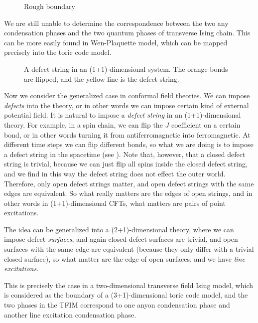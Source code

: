 \documentclass[hyperref, a4paper]{article}
\begin{document}
\begin{figure}
    \centering
    
    \caption{Rough boundary}
    \label{fig:rough}
\end{figure}

We are still unable to determine the correspondence between the two any condensation phases and the two quantum
phases of transverse Ising chain. This can be more easily found in Wen-Plaquette model, which can be mapped 
precisely into the toric code model. 

\begin{figure}
    \centering
    
    \caption{A defect string in an (1+1)-dimensional system. The orange bonds are flipped, and the yellow line is the defect string.}
    \label{fig:defect-string-1d}
\end{figure}

Now we consider the generalized case in conformal field theories. We can impose \emph{defects} into the theory,
or in other words we can impose certain kind of external potential field. It is natural to impose a 
\emph{defect string} in an (1+1)-dimensional theory. For example, in a spin chain, we can flip the $J$ coefficient
on a certain bond, or in other words turning it from antiferromagnetic into ferromagnetic. At different 
time steps we can flip different bonds, so what we are doing is to impose a defect string in the spacetime 
(see ). Note that, however, that a closed defect string is trivial, because we can 
just flip all spins inside the closed defect string, and we find in this way the defect string does not effect the outer world.
Therefore, only open defect strings matter, and open defect strings with the same edges are equivalent. 
So what really matters are the edges of open strings, and in other words in (1+1)-dimensional CFTs, what matters
are pairs of point excitations.

The idea can be generalized into a (2+1)-dimensional theory, where we can impose defect \emph{surfaces}, and 
again closed defect surfaces are trivial, and open surfaces with the same edge are equivalent (because they 
only differ with a trivial closed surface), so what matter are the edge of open surfaces, and we have 
\emph{line excitations}.

This is precisely the case in a two-dimensional transverse field Ising model, which is considered as the boundary 
of a (3+1)-dimensional toric code model, and the two phases in the TFIM correspond to one anyon condensation phase 
and another line excitation condensation phase.  
\end{document}
